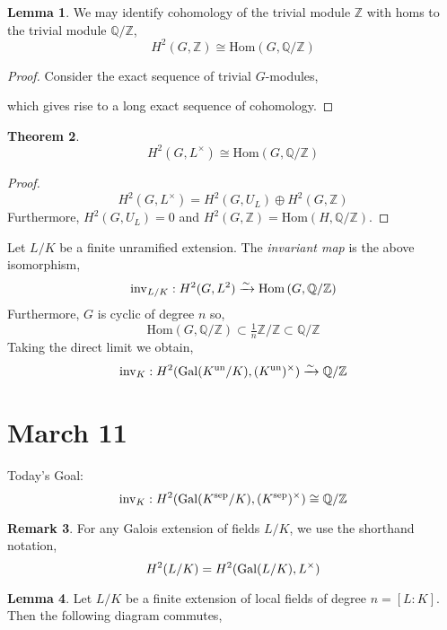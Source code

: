 \documentclass[12pt]{extarticle}
\newcommand{\Z}{\mathbb{Z}}
\newcommand{\Q}{\mathbb{Q}}
\newcommand{\Hom}[2]{\mathrm{Hom}\left( #1, #2 \right)}
\theoremstyle{definition}
\newtheorem{theorem}{Theorem}[section]
\newtheorem{lemma}[theorem]{Lemma}
\newtheorem{remark}[theorem]{Remark}
\newenvironment{definition}[1][Definition:]{\begin{trivlist}
\item[\hskip \labelsep {\bfseries #1}]}{\end{trivlist}}
\begin{document}
\begin{lemma}
We may identify cohomology of the trivial module $\Z$ with homs to the trivial module $\Q / \Z$,
\[ H^2(G, \Z) \cong \Hom{G}{\Q / \Z} \]
\end{lemma}

\begin{proof}
Consider the exact sequence of trivial $G$-modules,
\begin{center}
\end{center}
which gives rise to a long exact sequence of cohomology. 
\end{proof}

\begin{theorem}
\[ H^2(G, L^\times) \cong \Hom{G}{\Q / \Z} \]
\end{theorem}

\begin{proof}
\[ H^2(G, L^\times) = H^2(G, U_L) \oplus H^2(G, \Z) \]
Furthermore, $H^2(G, U_L) = 0$ and $H^2(G, \Z) = \Hom{H}{\Q / \Z}$. 
\end{proof}

\begin{definition}
Let $L / K$ be a finite unramified extension. The \textit{invariant map} is the above isomorphism,
\[ \inv_{L/K} : H^2(G, L^2) \xrightarrow{\sim} \Hom{G}{\Q / \Z}  \]
Furthermore, $G$ is cyclic of degree $n$ so,
\[ \Hom{G}{\Q / \Z} \subset \tfrac{1}{n} \Z / \Z \subset \Q / \Z \]
Taking the direct limit we obtain,
\[ \inv_K : H^2(\Gal{K^{\text{un}} / K}, (K^\text{un})^\times) \xrightarrow{\sim} \Q / \Z \]
\end{definition}

\section{March 11}

Today's Goal:
\[ \inv_K : H^2(\Gal{K^{\text{sep}} / K}, (K^{\text{sep}})^\times) \cong \Q / \Z \]

\begin{remark}
For any Galois extension of fields $L / K$, we use the shorthand notation,
\[ H^2(L/K) = H^2(\mathrm{Gal} (L/K), L^\times) \] 
\end{remark}

\begin{lemma}
Let $L / K$ be a finite extension of local fields of degree $n = [L : K]$. Then the following diagram commutes,
\begin{center}
\end{center}
\end{lemma}
\end{document}

